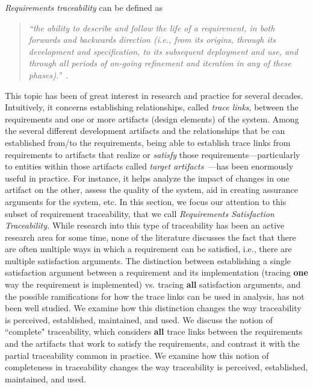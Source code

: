 \emph{Requirements traceability} can be defined as \\
\begin{quotation}
\textit{``the ability to describe and follow the life of a requirement, in both forwards and backwards direction (i.e., from its origins, through its development and specification, to its subsequent deployment and use, and through all periods of on-going refinement and iteration in any of these phases).''}~\cite{gotel}. \\
\end{quotation}

This topic has been of great interest in research and practice for several decades. Intuitively, it concerns establishing relationships, called \emph{trace links}, between the requirements and one or more artifacts (design elements) of the system. 
Among the several different development artifacts and the relationships that be can established from/to the requirements, being able to establish trace links from requirements to artifacts that realize or \emph{satisfy} those requirements---particularly to entities within those artifacts called \emph{target artifacts}~\cite{gotel2012traceability}---has been enormously useful in practice. 
For instance, it helps analyze the impact of changes in one artifact on the other, assess the quality of the system, 
aid in creating assurance arguments for the system, etc. 
In this section, we focus our attention to this subset of requirement traceability, that we call \emph{Requirements Satisfaction Traceability.}  While research into this type of
traceability has been an active research area for some time, none of the
literature discusses the fact that there are often multiple ways in which a requirement can be satisfied, i.e., there are multiple satisfaction arguments.
The distinction between establishing a single satisfaction argument
between a requirement and its implementation (tracing \textbf{one} way the requirement is implemented) vs. tracing \textbf{all} satisfaction arguments, and the possible ramifications for how the trace
links can be used in analysis, has not been well studied.  We examine how this distinction
changes the way traceability is perceived, established, maintained, and used.  We discuss the notion of ``complete" traceability, which considers \textbf{all} trace
links between the requirements and the artifacts that work to satisfy the
requirements, and contrast it with the partial traceability common in
practice. We examine how this notion of completeness in traceability changes the way traceability is perceived, established, maintained, and used.

